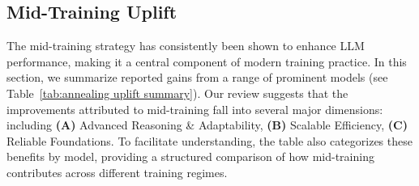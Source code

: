 

\subsection{Mid-Training Uplift}
The mid-training strategy has consistently been shown to enhance LLM performance, making it a central component of modern training practice. In this section, we summarize reported gains from a range of prominent models (see Table~\ref{tab:annealing uplift summary}). Our review suggests that the improvements attributed to mid-training fall into several major dimensions: including \textbf{(A)} Advanced Reasoning \& Adaptability, \textbf{(B)} Scalable Efficiency, \textbf{(C)} Reliable Foundations. To facilitate understanding, the table also categorizes these benefits by model, providing a structured comparison of how mid-training contributes across different training regimes.

